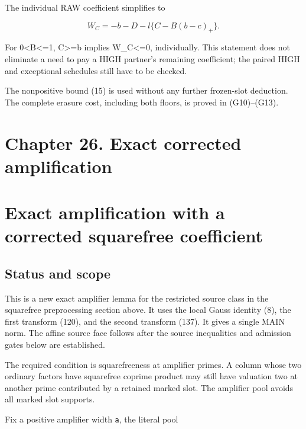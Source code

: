 The individual RAW coefficient simplifies to

\[
 W_C=-b-D-l\{C-B(b-c)_+\}.                                      \tag{15}
\]

For 0\textless B\textless=1, C\textgreater=b implies W\_\allowbreak{}C\textless=0, individually. This statement does not eliminate a need to pay a HIGH partner's remaining coefficient; the paired HIGH and exceptional schedules still have to be checked.

The nonpositive bound (15) is used without any further frozen-slot deduction. The complete erasure cost, including both floors, is proved in (G10)--(G13).

\hypertarget{sources:chapter-26.-exact-corrected-amplification}{%
\section{Chapter 26. Exact corrected amplification}\label{sources:chapter-26.-exact-corrected-amplification}}

\hypertarget{sources:exact-amplification-with-a-corrected-squarefree-coefficient}{%
\section{Exact amplification with a corrected squarefree coefficient}\label{sources:exact-amplification-with-a-corrected-squarefree-coefficient}}

\hypertarget{sources:status-and-scope}{%
\subsection{Status and scope}\label{sources:status-and-scope}}

This is a new exact amplifier lemma for the restricted source class in the squarefree preprocessing section above. It uses the local Gauss identity (8), the first transform (120), and the second transform (137). It gives a single MAIN norm. The affine source face follows after the source inequalities and admission gates below are established.

The required condition is squarefreeness at amplifier primes. A column whose two ordinary factors have squarefree coprime product may still have valuation two at another prime contributed by a retained marked slot. The amplifier pool avoids all marked slot supports.

Fix a positive amplifier width \texttt{a}, the literal pool

